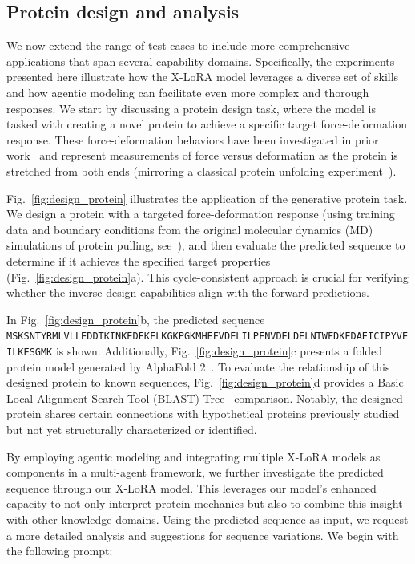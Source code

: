 \subsection{Protein design and analysis}

We now extend the range of test cases to include more comprehensive applications that span several capability domains. Specifically, the experiments presented here illustrate how the X-LoRA model leverages a diverse set of skills and how agentic modeling can facilitate even more complex and thorough responses. We start by discussing a protein design task, where the model is tasked with creating a novel protein to achieve a specific target force-deformation response. These force-deformation behaviors have been investigated in prior work~\cite{Ni2023ForceGen:Model} and represent measurements of force versus deformation as the protein is stretched from both ends (mirroring a classical protein unfolding experiment~\cite{Lu1998UnfoldingSimulation.}).

Fig.~\ref{fig:design_protein} illustrates the application of the generative protein task. We design a protein with a targeted force-deformation response (using training data and boundary conditions from the original molecular dynamics (MD) simulations of protein pulling, see~\cite{Ni2023ForceGen:Model}), and then evaluate the predicted sequence to determine if it achieves the specified target properties (Fig.~\ref{fig:design_protein}a). This cycle-consistent approach is crucial for verifying whether the inverse design capabilities align with the forward predictions.

In Fig.~\ref{fig:design_protein}b, the predicted sequence \texttt{MSKSNTYRMLVLLEDDTKINKEDEKFLKGKPGKMHEFVDELILPFNVDELDELNTWFDKFDAEICIPYVEILKESGMK} is shown. Additionally, Fig.~\ref{fig:design_protein}c presents a folded protein model generated by AlphaFold 2~\cite{Jumper2021HighlyAlphaFoldb}. To evaluate the relationship of this designed protein to known sequences, Fig.~\ref{fig:design_protein}d provides a Basic Local Alignment Search Tool (BLAST) Tree~\cite{Altschul1990BasicTool} comparison. Notably, the designed protein shares certain connections with hypothetical proteins previously studied but not yet structurally characterized or identified.

By employing agentic modeling and integrating multiple X-LoRA models as components in a multi-agent framework, we further investigate the predicted sequence through our X-LoRA model. This leverages our model’s enhanced capacity to not only interpret protein mechanics but also to combine this insight with other knowledge domains. Using the predicted sequence as input, we request a more detailed analysis and suggestions for sequence variations. We begin with the following prompt:

